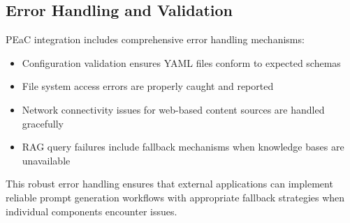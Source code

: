 \subsection{Error Handling and Validation}

PEaC integration includes comprehensive error handling mechanisms:

\begin{itemize}
    \item Configuration validation ensures YAML files conform to expected schemas
    \item File system access errors are properly caught and reported
    \item Network connectivity issues for web-based content sources are handled gracefully
    \item RAG query failures include fallback mechanisms when knowledge bases are unavailable
\end{itemize}

This robust error handling ensures that external applications can implement reliable prompt generation workflows with appropriate fallback strategies when individual components encounter issues.